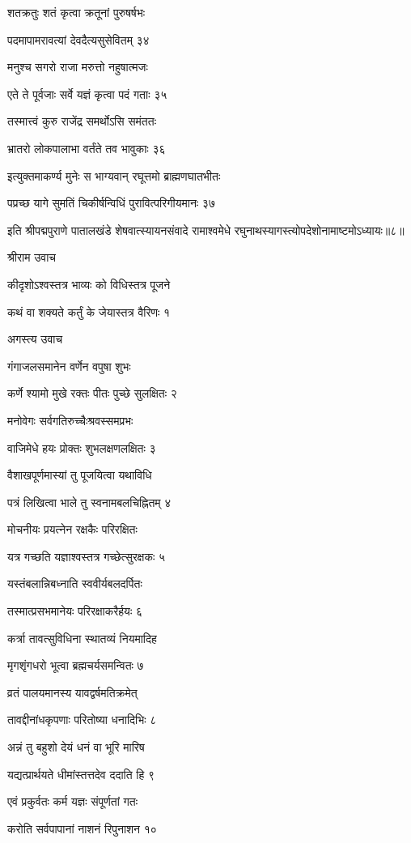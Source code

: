 शतक्रतुः शतं कृत्वा क्रतूनां पुरुषर्षभः

पदमापामरावत्यां देवदैत्यसुसेवितम् ३४

मनुश्च सगरो राजा मरुत्तो नहुषात्मजः

एते ते पूर्वजाः सर्वे यज्ञं कृत्वा पदं गताः ३५

तस्मात्त्वं कुरु राजेंद्र समर्थोऽसि समंततः

भ्रातरो लोकपालाभा वर्तंते तव भावुकाः ३६

इत्युक्तमाकर्ण्य मुनेः स भाग्यवान् रघूत्तमो ब्राह्मणघातभीतः

पप्रच्छ यागे सुमतिं चिकीर्षन्विधिं पुरावित्परिगीयमानः ३७

इति श्रीपद्मपुराणे पातालखंडे शेषवात्स्यायनसंवादे रामाश्वमेधे रघुनाथस्यागस्त्योपदेशोनामाष्टमोऽध्यायः॥८॥


श्रीराम उवाच

कीदृशोऽश्वस्तत्र भाव्यः को विधिस्तत्र पूजने

कथं वा शक्यते कर्तुं के जेयास्तत्र वैरिणः १

अगस्त्य उवाच

गंगाजलसमानेन वर्णेन वपुषा शुभः

कर्णे श्यामो मुखे रक्तः पीतः पुच्छे सुलक्षितः २

मनोवेगः सर्वगतिरुच्चैःश्रवस्समप्रभः

वाजिमेधे हयः प्रोक्तः शुभलक्षणलक्षितः ३

वैशाखपूर्णमास्यां तु पूजयित्वा यथाविधि

पत्रं लिखित्वा भाले तु स्वनामबलचिह्नितम् ४

मोचनीयः प्रयत्नेन रक्षकैः परिरक्षितः

यत्र गच्छति यज्ञाश्वस्तत्र गच्छेत्सुरक्षकः ५

यस्तंबलान्निबध्नाति स्ववीर्यबलदर्पितः

तस्मात्प्रसभमानेयः परिरक्षाकरैर्हयः ६

कर्त्रा तावत्सुविधिना स्थातव्यं नियमादिह

मृगशृंगधरो भूत्वा ब्रह्मचर्यसमन्वितः ७

व्रतं पालयमानस्य यावद्वर्षमतिक्रमेत्

तावद्दीनांधकृपणाः परितोष्या धनादिभिः ८

अन्नं तु बहुशो देयं धनं वा भूरि मारिष

यद्यत्प्रार्थयते धीमांस्तत्तदेव ददाति हि ९

एवं प्रकुर्वतः कर्म यज्ञः संपूर्णतां गतः

करोति सर्वपापानां नाशनं रिपुनाशन १०

